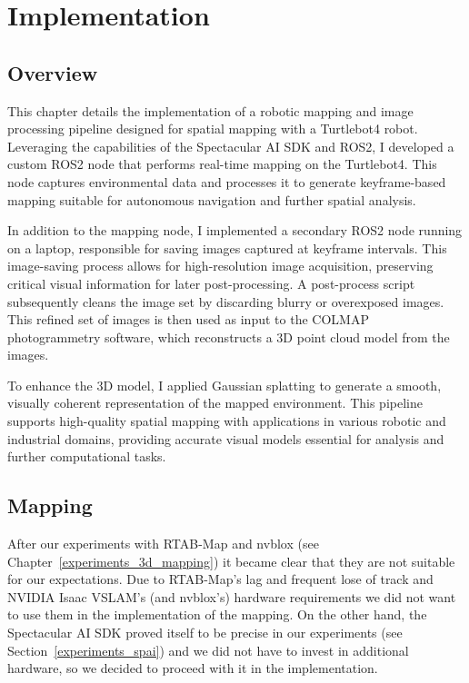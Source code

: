 \chapter{Implementation} \label{implementation}


\section{Overview}

This chapter details the implementation of a robotic mapping and image processing pipeline designed for spatial mapping with a Turtlebot4 robot. Leveraging the capabilities of the Spectacular AI SDK and ROS2, I developed a custom ROS2 node that performs real-time mapping on the Turtlebot4. This node captures environmental data and processes it to generate keyframe-based mapping suitable for autonomous navigation and further spatial analysis.

In addition to the mapping node, I implemented a secondary ROS2 node running on a laptop, responsible for saving images captured at keyframe intervals. This image-saving process allows for high-resolution image acquisition, preserving critical visual information for later post-processing. A post-process script subsequently cleans the image set by discarding blurry or overexposed images. This refined set of images is then used as input to the COLMAP photogrammetry software, which reconstructs a 3D point cloud model from the images.

To enhance the 3D model, I applied Gaussian splatting to generate a smooth, visually coherent representation of the mapped environment. This pipeline supports high-quality spatial mapping with applications in various robotic and industrial domains, providing accurate visual models essential for analysis and further computational tasks.

\section{Mapping}

After our experiments with RTAB-Map and nvblox (see Chapter~\ref{experiments_3d_mapping}) it became clear that they are not suitable for our expectations. Due to RTAB-Map's lag and frequent lose of track and NVIDIA Isaac VSLAM's (and nvblox's) hardware requirements we did not want to use them in the implementation of the mapping. On the other hand, the Spectacular AI SDK proved itself to be precise in our experiments (see Section~\ref{experiments_spai}) and we did not have to invest in additional hardware, so we decided to proceed with it in the implementation. 

